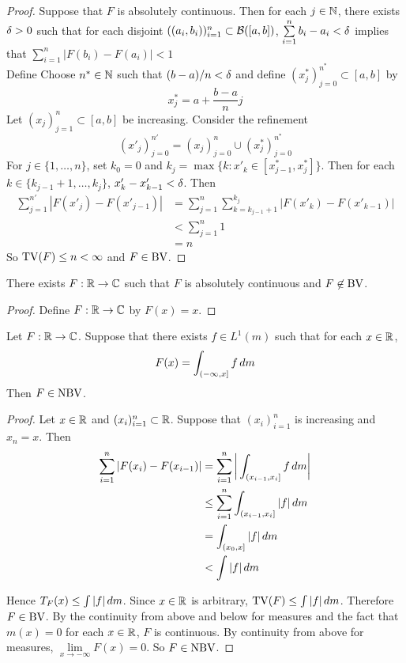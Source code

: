 \documentclass{book}
\begin{document}
	\begin{proof}
	Suppose that $F$ is absolutely continuous. Then for each $j \in \mathbb{N}$, there exists $\delta >0$ such that for each disjoint $((a_i, b_i))_{i=1}^n \subset \mathcal{B}([a,b])$, $\sum\limits_{i=1}^n b_i-a_i < \delta$ implies that $\sum\limits_{i=1}^n|F(b_i)-F(a_i)| < 1$ \\
	Define Choose $n^* \in \mathbb{N}$ such that $(b-a)/n < \delta$ and define $(x^*_j)_{j=0}^{n^*} \subset [a,b]$ by 
	$$x^*_j = a + \frac{b-a}{n}j$$ 
	Let $(x_j)_{j=1}^n \subset [a,b]$ be increasing. Consider the refinement 
	$$(x'_j)_{j=0}^{n'} = (x_j)_{j=0}^n \cup (x^*_j)_{j=0}^{n^*}$$ 
	For $j \in \{1, \ldots, n\}$, set $k_0 = 0$ and $k_j = \max \{k: x'_k \in [x^*_{j-1}, x^*_j] \}$. Then for each $k \in \{k_{j-1} + 1, \ldots, k_j\}$, $x'_k - x_{k-1}' < \delta$. Then 
	\begin{align*}
	\sum\limits_{j=1}^{n'} |F(x'_j) - F(x'_{j-1})| 
	&= \sum\limits_{j=1}^n \sum\limits_{k=k_{j-1}+1}^{k_j} |F(x'_k) - F(x'_{k-1})|  \\
	&< \sum\limits_{j=1}^n 1  \\
	&= n
	\end{align*}
	So $\text{TV}(F) \leq n < \infty$ and $F \in \text{BV}$. 
	\end{proof}
	
	\begin{ex}
	There exists $F:\mathbb{R} \rightarrow \mathbb{C}$ such that $F$ is absolutely continuous and $F \not \in \text{BV}$. 
	\end{ex}	
	
	\begin{proof}
	Define $F: \mathbb{R} \rightarrow \mathbb{C}$ by $F(x) = x$. 
	\end{proof}
	
	\begin{ex}  
		Let $F: \mathbb{R} \rightarrow \mathbb{C}$. Suppose that there exists $f \in L^1(m)$ such that for each $x \in \mathbb{R}$,
		$$F(x) = \int_{(-\infty, x]}f\, d m$$ 
		Then $F \in \text{NBV}$.
	\end{ex}
	
	\begin{proof}
		Let $x \in \mathbb{R}$ and $(x_i)_{i=1}^n \subset \mathbb{R}$. Suppose that $(x_i)_{i=1}^n$ is increasing and $x_n=x$. Then 
		\begin{align*}
			\sum\limits_{i=1}^n|F(x_i)-F(x_{i-1})| 
			&= \sum\limits_{i=1}^n \bigg| \int_{(x_{i-1},x_i]}f\, d m \bigg|\\
			& \leq \sum\limits_{i=1}^n \int_{(x_{i-1},x_i]}|f|\, d m \\
			& = \int_{(x_0,x]}|f|\, d m\\
			& < \int|f|\, d m
		\end{align*}
		
		Hence $T_F(x) \leq \int |f|\, d m$. Since $x \in \mathbb{R}$ is arbitrary, $\text{TV}(F) \leq \int |f|\, d m$. Therefore $F \in \text{BV}$. By the continuity from above and below for measures and the fact that $m({x})=0$ for each $x \in \mathbb{R}$, $F$ is continuous. By continuity from above for measures, $\lim\limits_{x \rightarrow -\infty} F(x) =0$. So $F \in \text{NBV}$.
	\end{proof}
	
\end{document}
